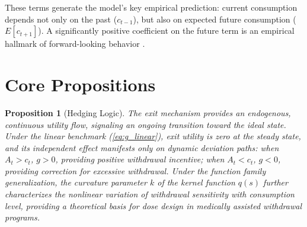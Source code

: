 \documentclass[12pt]{article}
\newtheorem{proposition}{Proposition}
\begin{document}
These terms generate the model's key empirical prediction: current consumption depends not only on the past ($c_{t-1}$), but also on
expected future consumption ($E[c_{t+1}]$). A significantly positive coefficient on the future term is an empirical hallmark of forward-looking behavior
\cite{Chaloupka1991,Becker1994}.

\section{Core Propositions}

\begin{proposition}[Hedging Logic]
The exit mechanism provides an endogenous, continuous utility flow, signaling an ongoing transition toward the ideal state.
Under the linear benchmark (\ref{eq:g_linear}), exit utility is zero at the steady state,
and its independent effect manifests only on dynamic deviation paths: when $A_t > c_t$, $g > 0$, providing positive withdrawal incentive;
when $A_t < c_t$, $g < 0$, providing correction for excessive withdrawal.
Under the function family generalization, the curvature parameter $k$ of the kernel function $q(s)$
further characterizes the nonlinear variation of withdrawal sensitivity with consumption level,
providing a theoretical basis for dose design in medically assisted withdrawal programs.
\end{proposition}
\end{document}
